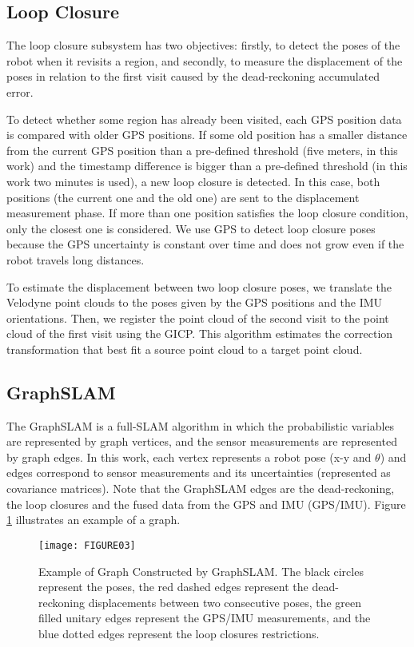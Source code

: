 \subsection{Loop Closure}

The loop closure subsystem has two objectives: firstly, to detect the poses of the robot when it revisits a region, and secondly, to measure the displacement of the poses in relation to the first visit caused by the dead-reckoning accumulated error.

To detect whether some region has already been visited, each GPS position data is compared with older GPS positions. If some old position has a smaller distance from the current GPS position than a pre-defined threshold (five meters, in this work) and the timestamp difference is bigger than a pre-defined threshold (in this work two minutes is used), a new loop closure is detected. In this case, both positions (the current one and the old one) are sent to the displacement measurement phase. If more than one position satisfies the loop closure condition, only the closest one is considered. We use GPS to detect loop closure poses because the GPS uncertainty is constant over time and does not grow even if the robot travels long distances.

To estimate the displacement between two loop closure poses, we translate the Velodyne point clouds to the poses given by the GPS positions and the IMU orientations. Then, we register the point cloud of the second visit to the point cloud of the first visit using the GICP. This algorithm estimates the correction transformation that best fit a source point cloud to a target point cloud.

\subsection{GraphSLAM}

The GraphSLAM is a full-SLAM algorithm \cite{10thrun2006graph} in which the probabilistic variables are represented by graph vertices, and the sensor measurements are represented by graph edges. In this work, each vertex represents a robot pose (x-y and $\theta$) and edges correspond to sensor measurements and its uncertainties (represented as covariance matrices). Note that the GraphSLAM edges are the dead-reckoning, the loop closures and the fused data from the GPS and IMU (GPS/IMU). Figure \ref{Fig::FIGURE03} illustrates an example of a graph.

\begin{figure}[ht]
    \centering
    \texttt{[image: FIGURE03]}
    \caption{Example of Graph Constructed by GraphSLAM. The black circles represent the poses, the red dashed edges represent the dead-reckoning displacements between two consecutive poses, the green filled unitary edges represent the GPS/IMU measurements, and the blue dotted edges represent the loop closures restrictions.}
    \label{Fig::FIGURE03}
\end{figure}

